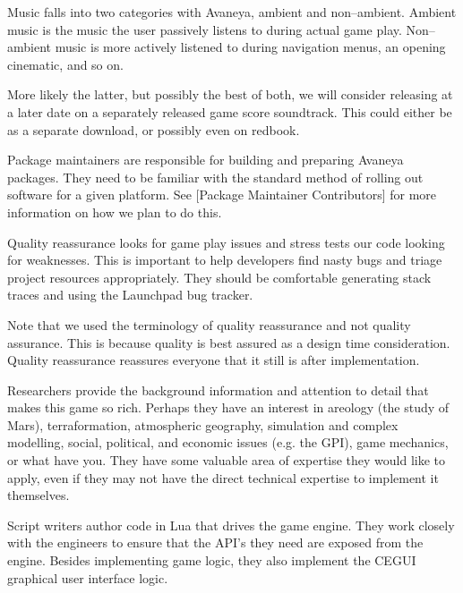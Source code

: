 
Music falls into two categories with Avaneya, ambient and non--ambient. Ambient music is the music the user passively listens to during actual game play. Non--ambient music is more actively listened to during navigation menus, an opening cinematic, and so on. 

More likely the latter, but possibly the best of both, we will consider releasing at a later date on a separately released game score soundtrack. This could either be as a separate download, or possibly even on redbook.


Package maintainers are responsible for building and preparing Avaneya packages. They need to be familiar with the standard method of rolling out software for a given platform. See [Package Maintainer Contributors] for more information on how we plan to do this.


Quality reassurance looks for game play issues and stress tests our code looking for weaknesses. This is important to help developers find nasty bugs and triage project resources appropriately. They should be comfortable generating stack traces and using the Launchpad bug tracker.

Note that we used the terminology of quality reassurance and not quality assurance. This is because quality is best assured as a design time consideration. Quality reassurance reassures everyone that it still is after implementation.


Researchers provide the background information and attention to detail that makes this game so rich. Perhaps they have an interest in areology (the study of Mars), terraformation, atmospheric geography, simulation and complex modelling, social, political, and economic issues (e.g. the GPI), game mechanics, or what have you. They have some valuable area of expertise they would like to apply, even if they may not have the direct technical expertise to implement it themselves.


Script writers author code in Lua that drives the game engine. They work closely with the engineers to ensure that the API's they need are exposed from the engine. Besides implementing game logic, they also implement the CEGUI graphical user interface logic.

